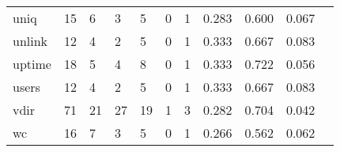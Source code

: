\begin{longtable}{lp{1.20cm}p{1.20cm}p{1.20cm}p{1.20cm}p{1.20cm}p{1.20cm}p{1.20cm}p{1.20cm}p{1.20cm}p{1.20cm}}
uniq      &                                    15 &                                                  6 &                                                  3 &                                                  5 &                                                  0 &                                                  1 &                                         0.283 &                                              0.600 &                                              0.067 \\
unlink    &                                    12 &                                                  4 &                                                  2 &                                                  5 &                                                  0 &                                                  1 &                                         0.333 &                                              0.667 &                                              0.083 \\
uptime    &                                    18 &                                                  5 &                                                  4 &                                                  8 &                                                  0 &                                                  1 &                                         0.333 &                                              0.722 &                                              0.056 \\
users     &                                    12 &                                                  4 &                                                  2 &                                                  5 &                                                  0 &                                                  1 &                                         0.333 &                                              0.667 &                                              0.083 \\
vdir      &                                    71 &                                                 21 &                                                 27 &                                                 19 &                                                  1 &                                                  3 &                                         0.282 &                                              0.704 &                                              0.042 \\
wc        &                                    16 &                                                  7 &                                                  3 &                                                  5 &                                                  0 &                                                  1 &                                         0.266 &                                              0.562 &                                              0.062 \\

\end{longtable}
